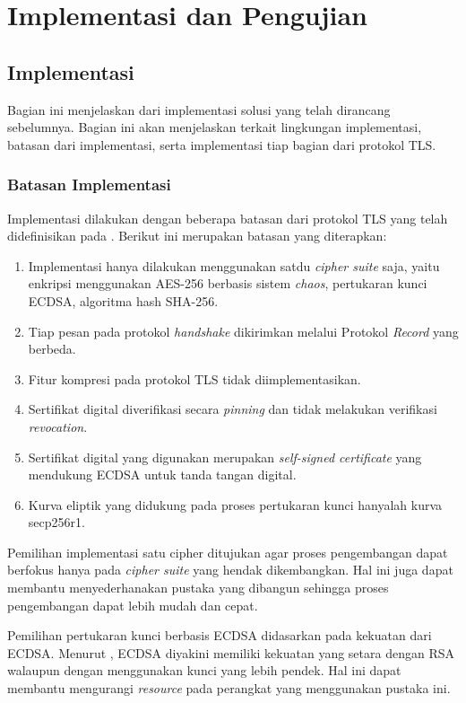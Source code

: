 \chapter{Implementasi dan Pengujian}

\section{Implementasi}

Bagian ini menjelaskan dari implementasi solusi yang telah dirancang sebelumnya. Bagian ini akan menjelaskan terkait lingkungan implementasi, batasan dari implementasi, serta implementasi tiap bagian dari protokol TLS.

\subsection{Batasan Implementasi}
Implementasi dilakukan dengan beberapa batasan dari protokol TLS yang telah didefinisikan pada \textcite{rfc5246}. Berikut ini merupakan batasan yang diterapkan:

\begin{enumerate}
  \item Implementasi hanya dilakukan menggunakan satdu \emph{cipher suite} saja, yaitu enkripsi menggunakan AES-256 berbasis sistem \emph{chaos}, pertukaran kunci ECDSA, algoritma hash SHA-256.
  \item Tiap pesan pada protokol \emph{handshake} dikirimkan melalui Protokol \emph{Record} yang berbeda.
  \item Fitur kompresi pada protokol TLS tidak diimplementasikan.
  \item Sertifikat digital diverifikasi secara \emph{pinning} dan tidak melakukan verifikasi \emph{revocation}.
  \item Sertifikat digital yang digunakan merupakan \emph{self-signed certificate} yang mendukung ECDSA untuk tanda tangan digital.
  \item Kurva eliptik yang didukung pada proses pertukaran kunci hanyalah kurva secp256r1.
\end{enumerate}
  
Pemilihan implementasi satu cipher ditujukan agar proses pengembangan dapat berfokus hanya pada \emph{cipher suite} yang hendak dikembangkan. Hal ini juga dapat membantu menyederhanakan pustaka yang dibangun sehingga proses pengembangan dapat lebih mudah dan cepat. 

Pemilihan pertukaran kunci berbasis ECDSA didasarkan pada kekuatan dari ECDSA. Menurut \textcite{munir2019}, ECDSA diyakini memiliki kekuatan yang setara dengan RSA walaupun dengan menggunakan kunci yang lebih pendek. Hal ini dapat membantu mengurangi \emph{resource} pada perangkat yang menggunakan pustaka ini.

